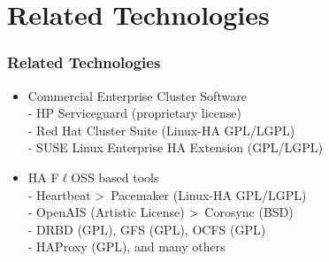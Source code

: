 \section{Related Technologies}

\begin{frame}%
\frametitle{Related Technologies}

\begin{itemize}
  \item Commercial Enterprise Cluster Software\\
	- HP Serviceguard (proprietary license)\\
	- Red Hat Cluster Suite (Linux-HA GPL/LGPL)\\
	- SUSE Linux Enterprise HA Extension (GPL/LGPL)

  \item HA F$\ell$OSS based tools\\
	- Heartbeat \textgreater\ Pacemaker (Linux-HA GPL/LGPL)\\
	- OpenAIS (Artistic License) \textgreater\ Corosync (BSD)\\
	- DRBD (GPL), GFS (GPL), OCFS (GPL)\\
	- HAProxy (GPL), and many others
  
\end{itemize}

\end{frame}
